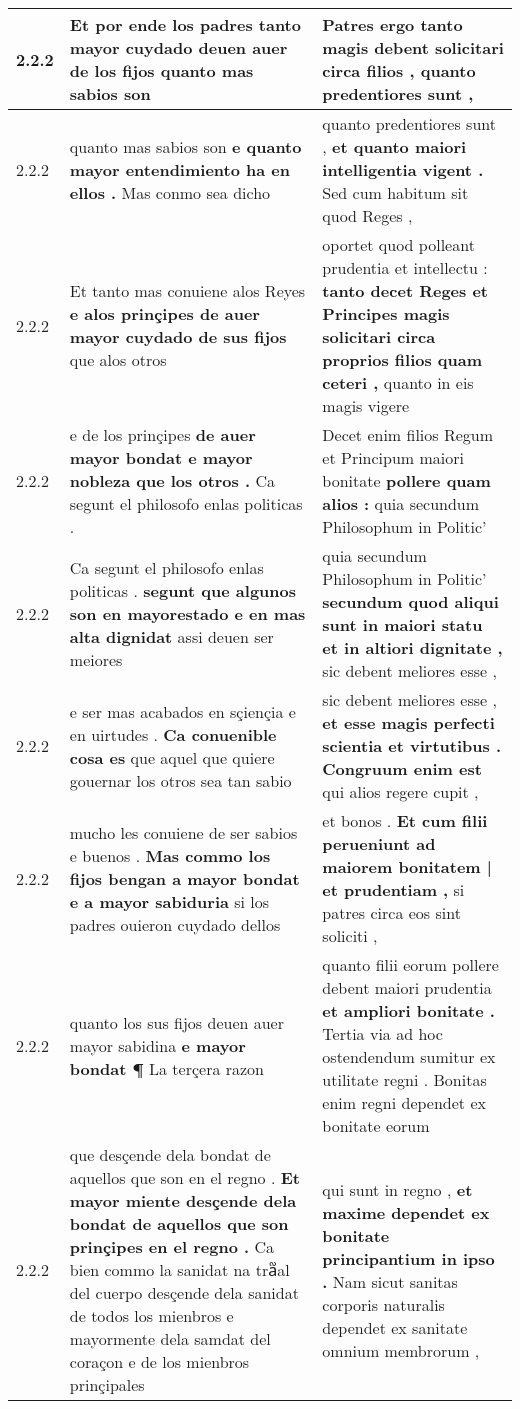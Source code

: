 \begin{tabular}{|p{1cm}|p{6.5cm}|p{6.5cm}|}
2.2.2 & Et por ende los padres \textbf{ tanto mayor cuydado deuen auer de los fijos } quanto mas sabios son & Patres ergo \textbf{ tanto magis debent solicitari circa filios , } quanto predentiores sunt , \\\hline
2.2.2 & quanto mas sabios son \textbf{ e quanto mayor entendimiento ha en ellos . } Mas conmo sea dicho & quanto predentiores sunt , \textbf{ et quanto maiori intelligentia vigent . } Sed cum habitum sit quod Reges , \\\hline
2.2.2 & Et tanto mas conuiene alos Reyes \textbf{ e alos prinçipes de auer mayor cuydado de sus fijos } que alos otros & oportet quod polleant prudentia et intellectu : \textbf{ tanto decet Reges et Principes magis solicitari circa proprios filios quam ceteri , } quanto in eis magis vigere \\\hline
2.2.2 & e de los prinçipes \textbf{ de auer mayor bondat e mayor nobleza que los otros . } Ca segunt el philosofo enlas politicas . & Decet enim filios Regum et Principum maiori bonitate \textbf{ pollere quam alios : } quia secundum Philosophum in Politic’ \\\hline
2.2.2 & Ca segunt el philosofo enlas politicas . \textbf{ segunt que algunos son en mayorestado e en mas alta dignidat } assi deuen ser meiores & quia secundum Philosophum in Politic’ \textbf{ secundum quod aliqui sunt in maiori statu et in altiori dignitate , } sic debent meliores esse , \\\hline
2.2.2 & e ser mas acabados en sçiençia e en uirtudes . \textbf{ Ca conuenible cosa es } que aquel que quiere gouernar los otros sea tan sabio & sic debent meliores esse , \textbf{ et esse magis perfecti scientia et virtutibus . Congruum enim est } qui alios regere cupit , \\\hline
2.2.2 & mucho les conuiene de ser sabios e buenos . \textbf{ Mas commo los fijos bengan a mayor bondat e a mayor sabiduria } si los padres ouieron cuydado dellos & et bonos . \textbf{ Et cum filii perueniunt ad maiorem bonitatem | et prudentiam , } si patres circa eos sint soliciti , \\\hline
2.2.2 & quanto los sus fijos deuen auer mayor sabidina \textbf{ e mayor bondat ¶ } La terçera razon & quanto filii eorum pollere debent maiori prudentia \textbf{ et ampliori bonitate . } Tertia via ad hoc ostendendum sumitur ex utilitate regni . Bonitas enim regni dependet ex bonitate eorum \\\hline
2.2.2 & que desçende dela bondat de aquellos que son en el regno . \textbf{ Et mayor miente desçende dela bondat de aquellos que son prinçipes en el regno . } Ca bien commo la sanidat na tra᷑al del cuerpo desçende dela sanidat de todos los mienbros e mayormente dela samdat del coraçon e de los mienbros prinçipales & qui sunt in regno , \textbf{ et maxime dependet ex bonitate principantium in ipso . } Nam sicut sanitas corporis naturalis dependet ex sanitate omnium membrorum , \\\hline

\end{tabular}
